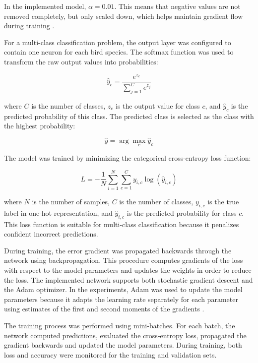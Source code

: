 \documentclass[
onecolumn,
]{ceurart}
\begin{document}
	In the implemented model, \(\alpha = 0.01\). This means that negative values are not removed completely, but only scaled down, which helps maintain gradient flow during training \cite{goodfellow2016deep}.


	For a multi-class classification problem, the output layer was configured to contain one neuron for each bird species. The softmax function was used to transform the raw output values into probabilities:
	
	\begin{equation}
		\hat{y}_c = \frac{e^{z_c}}{\sum_{j=1}^{C} e^{z_j}}
	\end{equation}
	
	where \(C\) is the number of classes, \(z_c\) is the output value for class \(c\), and \(\hat{y}_c\) is the predicted probability of this class. The predicted class is selected as the class with the highest probability:
	
	\begin{equation}
		\hat{y} = \arg\max_c \hat{y}_c
	\end{equation}
	
	The model was trained by minimizing the categorical cross-entropy loss function:
	
	\begin{equation}
		L = -\frac{1}{N}\sum_{i=1}^{N}\sum_{c=1}^{C} y_{i,c}\log(\hat{y}_{i,c})
	\end{equation}
	
	where \(N\) is the number of samples, \(C\) is the number of classes, \(y_{i,c}\) is the true label in one-hot representation, and \(\hat{y}_{i,c}\) is the predicted probability for class \(c\). This loss function is suitable for multi-class classification because it penalizes confident incorrect predictions.
	

	During training, the error gradient was propagated backwards through the network using backpropagation. This procedure computes gradients of the loss with respect to the model parameters and updates the weights in order to reduce the loss. The implemented network supports both stochastic gradient descent and the Adam optimizer. In the experiments, Adam was used to update the model parameters because it adapts the learning rate separately for each parameter using estimates of the first and second moments of the gradients \cite{kingma2015adam}.
	

	The training process was performed using mini-batches. For each batch, the network computed predictions, evaluated the cross-entropy loss, propagated the gradient backwards and updated the model parameters. During training, both loss and accuracy were monitored for the training and validation sets.
	
\end{document}
